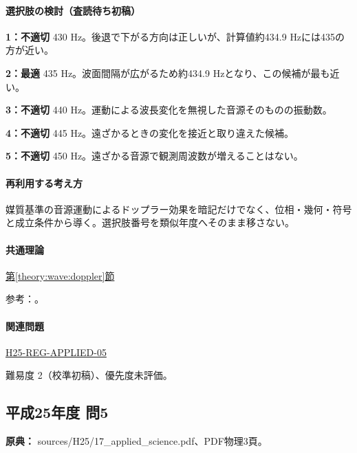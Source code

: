 \paragraph{選択肢の検討（査読待ち初稿）}\mbox{}\par

\noindent\textbf{1：不適切} 430 Hz。後退で下がる方向は正しいが、計算値約434.9 Hzには435の方が近い。\par

\noindent\textbf{2：最適} 435 Hz。波面間隔が広がるため約434.9 Hzとなり、この候補が最も近い。\par

\noindent\textbf{3：不適切} 440 Hz。運動による波長変化を無視した音源そのものの振動数。\par

\noindent\textbf{4：不適切} 445 Hz。遠ざかるときの変化を接近と取り違えた候補。\par

\noindent\textbf{5：不適切} 450 Hz。遠ざかる音源で観測周波数が増えることはない。\par

\paragraph{再利用する考え方} 媒質基準の音源運動によるドップラー効果を暗記だけでなく、位相・幾何・符号と成立条件から導く。選択肢番号を類似年度へそのまま移さない。

\paragraph{共通理論} \hyperref[theory:wave:doppler]{第\ref*{theory:wave:doppler}節}

\par 参考：\cite{os_doppler}。

\paragraph{関連問題} \hyperref[q:h25-reg-applied-05]{H25-REG-APPLIED-05}

\par 難易度 2（校準初稿）、優先度未評価。

\subsection{平成25年度 問5}
\label{q:h25-reg-applied-05}

\noindent\textbf{原典：} sources/H25/17\_applied\_science.pdf、PDF物理3頁。

